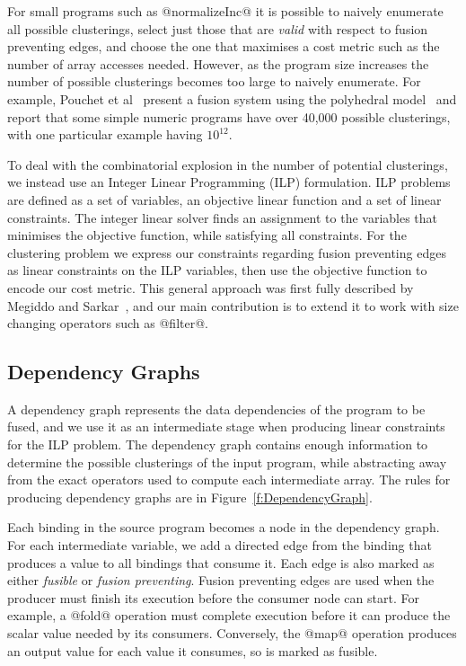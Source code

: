 For small programs such as @normalizeInc@ it is possible to naively enumerate all possible clusterings, select just those that are \emph{valid} with respect to fusion preventing edges, and choose the one that maximises a cost metric such as the number of array accesses needed. However, as the program size increases the number of possible clusterings becomes too large to naively enumerate. For example, Pouchet et al~\cite{pouchet2010combined} present a fusion system using the polyhedral model~\cite{pouchet2011polyhedral} and report that some simple numeric programs have over 40,000 possible clusterings, with one particular example having $10^{12}$. 

To deal with the combinatorial explosion in the number of potential clusterings, we instead use an Integer Linear Programming (ILP) formulation. ILP problems are defined as a set of variables, an objective linear function and a set of linear constraints. The integer linear solver finds an assignment to the variables that minimises the objective function, while satisfying all constraints. For the clustering problem we express our constraints regarding fusion preventing edges as linear constraints on the ILP variables, then use the objective function to encode our cost metric. This general approach was first fully described by Megiddo and Sarkar~\cite{megiddo1998optimal}, and our main contribution is to extend it to work with size changing operators such as @filter@. 


\subsection{Dependency Graphs}
A dependency graph represents the data dependencies of the program to be fused, and we use it as an intermediate stage when producing linear constraints for the ILP problem. The dependency graph contains enough information to determine the possible clusterings of the input program, while abstracting away from the exact operators used to compute each intermediate array. The rules for producing dependency graphs are in Figure~\ref{f:DependencyGraph}.

Each binding in the source program becomes a node in the dependency graph. For each intermediate variable, we add a directed edge from the binding that produces a value to all bindings that consume it. Each edge is also marked as either \emph{fusible} or \emph{fusion preventing}. Fusion preventing edges are used when the producer must finish its execution before the consumer node can start. For example, a @fold@ operation must complete execution before it can produce the scalar value needed by its consumers. Conversely, the @map@ operation produces an output value for each value it consumes, so is marked as fusible. 

